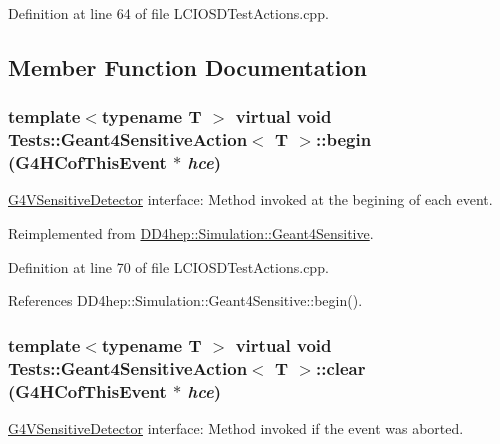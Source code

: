 Definition at line 64 of file LCIOSDTestActions.cpp.

\subsection{Member Function Documentation}
\hypertarget{class_tests_1_1_geant4_sensitive_action_a739fa2551e0217a591c5e99ae09d883a}{
\subsubsection[{begin}]{\setlength{\rightskip}{0pt plus 5cm}template$<$typename T $>$ virtual void {\bf Tests::Geant4SensitiveAction}$<$ {\bf T} $>$::begin (G4HCofThisEvent $\ast$ {\em hce})}}
\label{class_tests_1_1_geant4_sensitive_action_a739fa2551e0217a591c5e99ae09d883a}


\hyperlink{class_g4_v_sensitive_detector}{G4VSensitiveDetector} interface: Method invoked at the begining of each event. 

Reimplemented from \hyperlink{class_d_d4hep_1_1_simulation_1_1_geant4_sensitive_a2967b095e6c32ae82f68a8b25a086c86}{DD4hep::Simulation::Geant4Sensitive}.

Definition at line 70 of file LCIOSDTestActions.cpp.

References DD4hep::Simulation::Geant4Sensitive::begin().\hypertarget{class_tests_1_1_geant4_sensitive_action_a4d02434822c244ee5c5d6aee7e15c993}{
\subsubsection[{clear}]{\setlength{\rightskip}{0pt plus 5cm}template$<$typename T $>$ virtual void {\bf Tests::Geant4SensitiveAction}$<$ {\bf T} $>$::clear (G4HCofThisEvent $\ast$ {\em hce})}}
\label{class_tests_1_1_geant4_sensitive_action_a4d02434822c244ee5c5d6aee7e15c993}


\hyperlink{class_g4_v_sensitive_detector}{G4VSensitiveDetector} interface: Method invoked if the event was aborted. 

